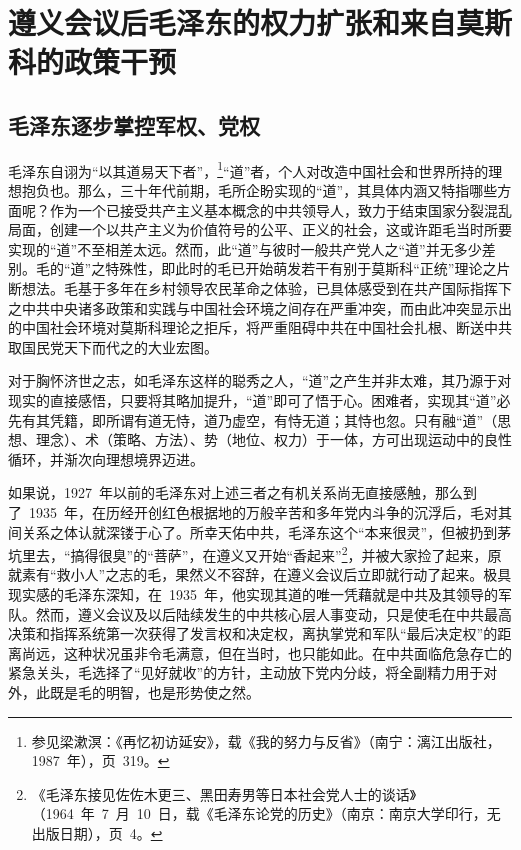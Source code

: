 
\chapter{遵义会议后毛泽东的权力扩张和来自莫斯科的政策干预}

\section{毛泽东逐步掌控军权、党权}

毛泽东自诩为“以其道易天下者”，\footnote{参见梁漱溟：《再忆初访延安》，载《我的努力与反省》（南宁：漓江出版社，1987~年），页~319。}“道”者，个人对改造中国社会和世界所持的理想抱负也。那么，三十年代前期，毛所企盼实现的“道”，其具体内涵又特指哪些方面呢？作为一个已接受共产主义基本概念的中共领导人，致力于结束国家分裂混乱局面，创建一个以共产主义为价值符号的公平、正义的社会，这或许距毛当时所要实现的“道”不至相差太远。然而，此“道”与彼时一般共产党人之“道”并无多少差别。毛的“道”之特殊性，即此时的毛已开始萌发若干有别于莫斯科“正统”理论之片断想法。毛基于多年在乡村领导农民革命之体验，已具体感受到在共产国际指挥下之中共中央诸多政策和实践与中国社会环境之间存在严重冲突，而由此冲突显示出的中国社会环境对莫斯科理论之拒斥，将严重阻碍中共在中国社会扎根、断送中共取国民党天下而代之的大业宏图。

对于胸怀济世之志，如毛泽东这样的聪秀之人，“道”之产生并非太难，其乃源于对现实的直接感悟，只要将其略加提升，“道”即可了悟于心。困难者，实现其“道”必先有其凭籍，即所谓有道无恃，道乃虚空，有恃无道；其恃也忽。只有融“道”（思想、理念）、术（策略、方法）、势（地位、权力）于一体，方可出现运动中的良性循环，并渐次向理想境界迈进。

如果说，1927~年以前的毛泽东对上述三者之有机关系尚无直接感触，那么到了~1935~年，在历经开创红色根据地的万般辛苦和多年党内斗争的沉浮后，毛对其间关系之体认就深镂于心了。所幸天佑中共，毛泽东这个“本来很灵”，但被扔到茅坑里去，“搞得很臭”的“菩萨”，在遵义又开始“香起来”\footnote{《毛泽东接见佐佐木更三、黑田寿男等日本社会党人士的谈话》（1964~年~7~月~10~日，载《毛泽东论党的历史》（南京：南京大学印行，无出版日期），页~4。}，并被大家捡了起来，原就素有“救小人”之志的毛，果然义不容辞，在遵义会议后立即就行动了起来。极具现实感的毛泽东深知，在~1935~年，他实现其道的唯一凭藉就是中共及其领导的军队。然而，遵义会议及以后陆续发生的中共核心层人事变动，只是使毛在中共最高决策和指挥系统第一次获得了发言权和决定权，离执掌党和军队“最后决定权”的距离尚远，这种状况虽非令毛满意，但在当时，也只能如此。在中共面临危急存亡的紧急关头，毛选择了“见好就收”的方针，主动放下党内分歧，将全副精力用于对外，此既是毛的明智，也是形势使之然。

